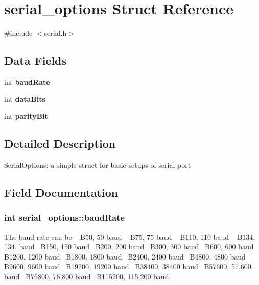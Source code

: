 \section{serial\+\_\+options Struct Reference}
\label{structserial__options}


{\ttfamily \#include $<$serial.\+h$>$}

\subsection*{Data Fields}
\begin{DoxyCompactItemize}
\item 
int {\bf baud\+Rate}
\item 
int {\bf data\+Bits}
\item 
int {\bf parity\+Bit}
\end{DoxyCompactItemize}


\subsection{Detailed Description}
Serial\+Options\+: a simple struct for basic setups of serial port 

\subsection{Field Documentation}
\subsubsection[{baud\+Rate}]{\setlength{\rightskip}{0pt plus 5cm}int serial\+\_\+options\+::baud\+Rate}\label{structserial__options_a7858a948e686550e34da72355d1671ac}
The baud rate can be ~\newline
 B50, 50 baud ~\newline
 B75, 75 baud ~\newline
 B110, 110 baud ~\newline
 B134, 134. baud~\newline
 B150, 150 baud~\newline
 B200, 200 baud~\newline
 B300, 300 baud~\newline
 B600, 600 baud~\newline
 B1200, 1200 baud~\newline
 B1800, 1800 baud~\newline
 B2400, 2400 baud~\newline
 B4800, 4800 baud~\newline
 B9600, 9600 baud~\newline
 B19200, 19200 baud~\newline
 B38400, 38400 baud~\newline
 B57600, 57,600 baud~\newline
 B76800, 76,800 baud~\newline
 B115200, 115,200 baud~\newline
